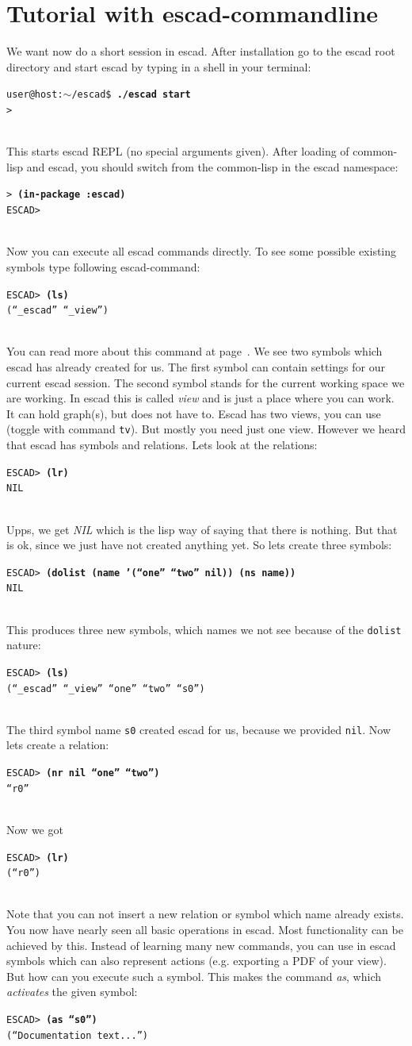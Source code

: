 \documentclass[a4paper, 12pt, openany]{scrbook}
\makeatletter
\newcommand{\shellcmdline}[2]{\\
  \setlength{\fboxsep}{2pt}\colorbox{black!20}{\parbox{\textwidth}{\texttt{user@host:$\sim$/escad\$ \textbf{#1}\\#2}}}\\}
\newcommand{\escadcmdline}[2]{\\\setlength{\fboxsep}{2pt}\colorbox{black!20}{\parbox{\textwidth}{\texttt{ESCAD> \textbf{#1}\\#2}}}\\}
\newcommand{\lispcmdline}[2]{\\\setlength{\fboxsep}{2pt}\colorbox{black!20}{\parbox{\textwidth}{\texttt{> \textbf{#1}\\#2}}}\\}
\makeatother
\begin{document}
\section{Tutorial with escad-commandline}
We want now do a short session in escad. After installation go to the escad root directory and start escad by typing in a shell in your terminal:
\shellcmdline{./escad start}{>}
This starts escad REPL (no special arguments given). After loading of common-lisp and escad, you should switch from the common-lisp in the escad namespace:
\lispcmdline{(in-package :escad)}{ESCAD>}
Now you can execute all escad commands directly. To see some possible existing symbols type following escad-command:
\escadcmdline{(ls)}{(``\_escad'' ``\_view'')}\label{ex:ls}
You can read more about this command at page~\pageref{it:ls}. We see two symbols which escad has already created for us. The first symbol can contain settings for our current escad session. The second symbol stands for the current working space we are working. In escad this is called \emph{view} and is just a place where you can work. It can hold graph(s), but does not have to. Escad has two views, you can use (toggle with command \texttt{tv}). But mostly you need just one view.
However we heard that escad has symbols and relations. Lets look at the relations:
\escadcmdline{(lr)}{NIL}\label{ex:lr}
Upps, we get \emph{NIL} which is the lisp way of saying that there is nothing. But that is ok, since we just have not created anything yet. So lets create three symbols:
\escadcmdline{(dolist (name '(``one'' ``two'' nil)) (ns name))}{NIL}\label{ex:ns}
This produces three new symbols, which names we not see because of the \texttt{dolist} nature:
\escadcmdline{(ls)}{(``\_escad'' ``\_view'' ``one'' ``two'' ``s0'')}
The third symbol name \texttt{s0} created escad for us, because we provided \texttt{nil}.
Now lets create a relation:
\escadcmdline{(nr nil ``one'' ``two'')}{``r0''}\label{ex:nr}
Now we got
\escadcmdline{(lr)}{(``r0'')}
Note that you can not insert a new relation or symbol which name already exists.
You now have nearly seen all basic operations in escad. Most functionality can be achieved by this. Instead of learning many new commands, you can use in escad symbols which can also represent actions (e.g. exporting a PDF of your view). But how can you execute such a symbol. This makes the command \emph{as}, which \emph{activates} the given symbol:
\escadcmdline{(as ``s0'')}{(``Documentation text...'')}
\end{document}
